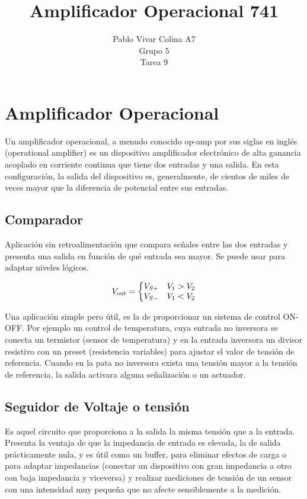 \documentclass{article}
\title{Amplificador Operacional 741}
\author{Pablo Vivar Colina A7\\
Grupo 5\\
Tarea 9
}
\begin{document}
\maketitle

\section{Amplificador Operacional}

Un amplificador operacional, a menudo conocido op-amp por sus siglas en inglés (operational amplifier) es un dispositivo amplificador electrónico de alta ganancia acoplado en corriente continua que tiene dos entradas y una salida. En esta configuración, la salida del dispositivo es, generalmente, de cientos de miles de veces mayor que la diferencia de potencial entre sus entradas.\citep{AmplificadorOperacional}


\subsection{Comparador}


Aplicación sin retroalimentación que compara señales entre las dos entradas y presenta una salida en función de qué entrada sea mayor. Se puede usar para adaptar niveles lógicos.\citep{AmplificadorOperacional}

\begin{equation}
    {\displaystyle V_{\rm {out}}=\left\{{\begin{matrix}V_{S+}&V_{1}>V_{2}\\V_{S-}&V_{1}<V_{2}\end{matrix}}\right.} 
\end{equation}

Una aplicación simple pero útil, es la de proporcionar un sistema de control ON-OFF. Por ejemplo un control de temperatura, cuya entrada no inversora se conecta un termistor (sensor de temperatura) y en la entrada inversora un divisor resistivo con un preset (resistencia variables) para ajustar el valor de tensión de referencia. Cuando en la pata no inversora exista una tensión mayor a la tensión de referencia, la salida activara alguna señalización o un actuador.\citep{AmplificadorOperacional}

\subsection{Seguidor de Voltaje o tensión}

Es aquel circuito que proporciona a la salida la misma tensión que a la entrada. Presenta la ventaja de que la impedancia de entrada es elevada, la de salida prácticamente nula, y es útil como un buffer, para eliminar efectos de carga o para adaptar impedancias (conectar un dispositivo con gran impedancia a otro con baja impedancia y viceversa) y realizar mediciones de tensión de un sensor con una intensidad muy pequeña que no afecte sensiblemente a la medición.\citep{AmplificadorOperacional}
\end{document}
